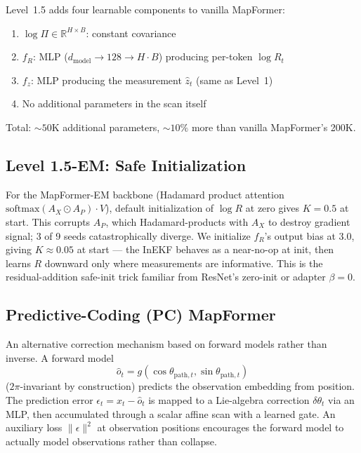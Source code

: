 Level~1.5 adds four learnable components to vanilla MapFormer:
\begin{enumerate}
  \item $\log \Pi \in \mathbb{R}^{H \times B}$: constant covariance
  \item $f_R$: MLP ($d_\mathrm{model} \to 128 \to H \cdot B$) producing
  per-token $\log R_t$
  \item $f_z$: MLP producing the measurement $\hat z_t$ (same as Level~1)
  \item No additional parameters in the scan itself
\end{enumerate}
Total: $\sim 50\mathrm{K}$ additional parameters, $\sim 10\%$ more than
vanilla MapFormer's 200K.

\subsection{Level 1.5-EM: Safe Initialization}

For the MapFormer-EM backbone (Hadamard product attention
$\mathrm{softmax}(A_X \odot A_P) \cdot V$), default initialization of
$\log R$ at zero gives $K{=}0.5$ at start. This corrupts $A_P$, which
Hadamard-products with $A_X$ to destroy gradient signal; 3 of 9 seeds
catastrophically diverge. We initialize $f_R$'s output bias at $3.0$,
giving $K \approx 0.05$ at start --- the InEKF behaves as a near-no-op
at init, then learns $R$ downward only where measurements are
informative. This is the residual-addition safe-init trick familiar from
ResNet's zero-init or adapter $\beta{=}0$.

\subsection{Predictive-Coding (PC) MapFormer}

An alternative correction mechanism based on forward models rather than
inverse. A forward model
\begin{equation}
  \hat o_t = g(\cos\theta_{\mathrm{path},t}, \sin\theta_{\mathrm{path},t})
\end{equation}
($2\pi$-invariant by construction) predicts the observation embedding
from position. The prediction error $\epsilon_t = x_t - \hat o_t$ is
mapped to a Lie-algebra correction $\delta\theta_t$ via an MLP, then
accumulated through a scalar affine scan with a learned gate. An
auxiliary loss $\|\epsilon\|^2$ at observation positions encourages the
forward model to actually model observations rather than collapse.

